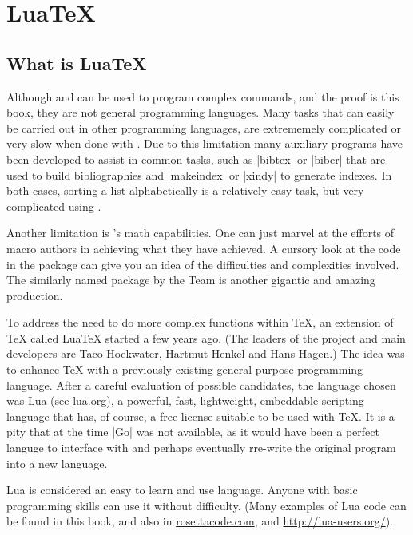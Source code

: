 \chapter{LuaTeX}

\section{What is LuaTeX}

Although \tex and \latexe can be used to program complex commands, and the proof is this book, they are not  general programming languages. Many tasks that can easily be carried out
in other programming languages, are extrememely complicated or very slow when done with \tex. Due to this limitation many auxiliary programs have been developed to assist in common tasks, such as |bibtex| or |biber| that are used to build bibliographies and |makeindex| or |xindy| to generate indexes. In both cases, sorting a list alphabetically is a relatively easy task, but very complicated using \tex.


Another limitation is \tex's math capabilities. One can just marvel at the efforts of \tex macro authors in achieving what they have achieved. A cursory look at the code in the  package  can give you an idea of the difficulties and complexities involved. The similarly named package by the  Team is another gigantic and amazing production.

To address the need to do more complex functions within \TeX, an extension of \TeX{} called Lua\TeX{} started a few years ago.  
(The leaders of the project and main developers are Taco Hoekwater, Hartmut Henkel and Hans Hagen.) The idea was to enhance \TeX{} with a previously existing general purpose programming language. After a careful evaluation of possible candidates, the language chosen was Lua (see \href{http://www.lua.org/}{lua.org}), a powerful, fast, lightweight, embeddable scripting language that has,  of course, a free license suitable to be used with \TeX. It is a pity that at the time |Go| was not available, as it would have been a perfect languge to interface with \tex and perhaps eventually rre-write the original program into a new language.

Lua is considered an easy to learn and use language. Anyone with basic programming skills can use it without difficulty. (Many examples of Lua code can be found in this book, and also in \href{http://rosettacode.org/wiki/Category:Lua}{rosettacode.com},
and \url{http://lua-users.org/}).

